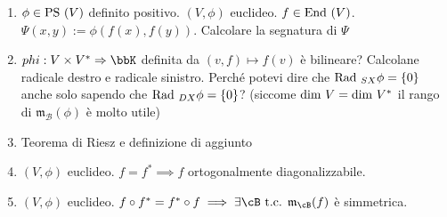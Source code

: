 \documentclass[a4paper,NoNotes,GeneralMath]{stdmdoc}
\begin{document}
\begin{enumerate}
		\item $\phi \in \mbox{PS }(V)$ definito positivo. $(V, \phi)$ euclideo. $f \in \mbox{End }(V)$. $\Psi(x,y) := \phi(f(x), f(y))$. Calcolare la segnatura di $\Psi$
		\item $phi: V\times V^{*} \rar \bbK$ definita da $(v, f) \mapsto f(v)$ è bilineare? Calcolane radicale destro e radicale sinistro. Perché potevi dire che $\mbox{Rad }_{SX} \phi = \{0\}$ anche solo sapendo che $\mbox{Rad }_{DX} \phi = \{0\}$? (siccome $\mbox{dim } V = \mbox{dim } V^{*}$ il rango di $\mathfrak{m}_{\mathcal{B}}(\phi)$ è molto utile)
		\item Teorema di Riesz e definizione di aggiunto
		\item $(V, \phi)$ euclideo. $f = f^{*} \implies f$ ortogonalmente diagonalizzabile.
		\item $(V, \phi)$ euclideo. $f \circ f^{*} = f^{*} \circ f \implies \exists \cB \tc \mathfrak{m}_{\cB}(f)$ è simmetrica.
	\end{enumerate}
\end{document}
